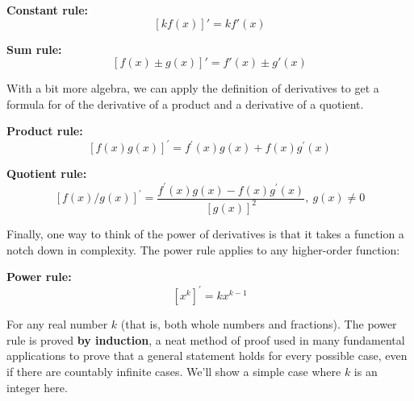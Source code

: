 \documentclass[
]{book}
\theoremstyle{definition}
\theoremstyle{definition}
\theoremstyle{definition}
\theoremstyle{definition}
\theoremstyle{remark}
\begin{document}
\textbf{Constant rule:} \[\left[k f(x)\right]' = k f'(x)\]

\textbf{Sum rule:} \[\left[f(x)\pm g(x)\right]' = f'(x)\pm g'(x)\]

With a bit more algebra, we can apply the definition of derivatives to get a formula for of the derivative of a product and a derivative of a quotient.

\textbf{Product rule:} \[\left[f(x)g(x)\right]^\prime = f^\prime(x)g(x)+f(x)g^\prime(x)\]

\textbf{Quotient rule:} \[\left[f(x)/g(x)\right]^\prime = \frac{f^\prime(x)g(x) - f(x)g^\prime(x)}{[g(x)]^2}, ~g(x)\neq 0\]

Finally, one way to think of the power of derivatives is that it takes a function a notch down in complexity. The power rule applies to any higher-order function:

\textbf{Power rule:} \[\left[x^k\right]^\prime = k x^{k-1}\]

For any real number \(k\) (that is, both whole numbers and fractions). The power rule is proved \textbf{by induction}, a neat method of proof used in many fundamental applications to prove that a general statement holds for every possible case, even if there are countably infinite cases. We'll show a simple case where \(k\) is an integer here.
\end{document}
